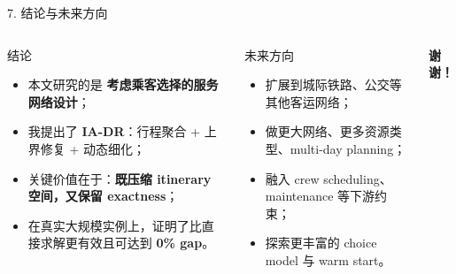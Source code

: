 \documentclass[aspectratio=169,11pt]{ctexbeamer}
\newcommand{\hl}[1]{\textcolor{TongjiBlue}{\textbf{#1}}}
\begin{document}
\begin{frame}{7. 结论与未来方向}
\begin{columns}[T,totalwidth=\textwidth]
\begin{block}{结论}
\begin{itemize}
    \item 本文研究的是 \hl{考虑乘客选择的服务网络设计}；
    \item 我提出了 \hl{IA-DR}：行程聚合 + 上界修复 + 动态细化；
    \item 关键价值在于：\hl{既压缩 itinerary 空间，又保留 exactness}；
    \item 在真实大规模实例上，证明了比直接求解更有效且可达到 \hl{0\% gap}。
\end{itemize}
\end{block}

\begin{block}{未来方向}
\begin{itemize}
    \item 扩展到城际铁路、公交等其他客运网络；
    \item 做更大网络、更多资源类型、multi-day planning；
    \item 融入 crew scheduling、maintenance 等下游约束；
    \item 探索更丰富的 choice model 与 warm start。
\end{itemize}
\end{block}

\vspace{0.2cm}
\begin{center}
\Large \textcolor{TongjiBlue}{\textbf{谢谢！}}
\end{center}
\end{columns}
\end{frame}

\appendix
\end{document}
